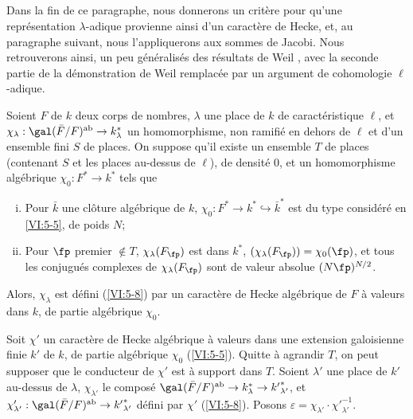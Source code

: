 \subsection{}\label{VI:5-9}

Dans la fin de ce paragraphe, nous donnerons un critère pour qu'une 
représentation $\lambda$-adique provienne ainsi d'un caractère de Hecke, 
et, au paragraphe suivant, nous l'appliquerons aux sommes de Jacobi. Nous 
retrouverons ainsi, un peu généralisés des résultats de Weil 
\cite{we52,we74-2}, avec la seconde partie de la démonstration de Weil 
remplacée par un argument de cohomologie $\ell$-adique. 





\begin{theorem_}\label{VI:5-10}
Soient $F$ de $k$ deux corps de nombres, $\lambda$ une place de $k$ de 
caractéristique $\ell$, et 
$\chi_\lambda:\gal(\bar F/F)^\textnormal{ab}\to k_\lambda^\ast$ un 
homomorphisme, non ramifié en dehors de $\ell$ et d'un ensemble fini $S$ de 
places. On suppose qu'il existe un ensemble $T$ de places (contenant $S$ et les 
places au-dessus de $\ell$), de densité $0$, et un homomorphisme algébrique 
$\chi_0:F^\ast \to k^\ast$ tels que 
\begin{enumerate}[(i)]
  \item Pour $\bar k$ une clôture algébrique de $k$, 
    $\chi_0:F^\ast \to k^\ast \hookrightarrow \bar k^\ast$ est du type 
    considéré en \ref{VI:5-5}, de poids $N$; 
\item Pour $\fp$ premier $\notin T$, $\chi_\lambda(F_\fp)$ est dans 
    $k^\ast$, $(\chi_\lambda(F_\fp))=\chi_0(\fp)$, et tous les conjugués 
    complexes de $\chi_\lambda(F_\fp)$ sont de valeur absolue $(N \fp)^{N/2}$. 
\end{enumerate}

Alors, $\chi_\lambda$ est défini (\ref{VI:5-8}) par un caractère de Hecke 
algébrique de $F$ à valeurs dans $k$, de partie algébrique $\chi_0$. 
\end{theorem_}

Soit $\chi'$ un caractère de Hecke algébrique à valeurs dans une 
extension galoisienne finie $k'$ de $k$, de partie algébrique $\chi_0$ 
(\ref{VI:5-5}). Quitte à agrandir $T$, on peut supposer que le conducteur de 
$\chi'$ est à support dans $T$. Soient $\lambda'$ une place de $k'$ au-dessus 
de $\lambda$, $\chi_{\lambda'}$ le composé 
$\gal(\bar F/F)^\text{ab}\to k_\lambda^\ast \to {k'}_{\lambda'}^\ast$, et 
$\chi_{\lambda'}':\gal(\bar F/F)^\text{ab}\to {k'}_{\lambda'}^\ast$ défini 
par $\chi'$ (\ref{VI:5-8}). Posons 
$\varepsilon = \chi_{\lambda'} \cdot {\chi'}_{\lambda'}^{-1}$. 

